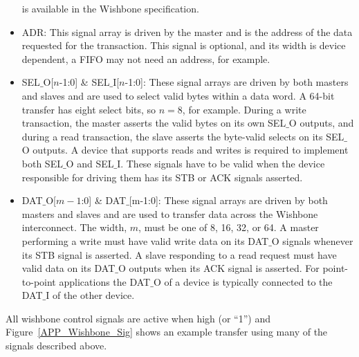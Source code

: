 \begin{itemize}
 is available in the Wishbone specification\cite{WB3_Spec}.
 \item ADR: This signal array is driven by the master and is the
 address of the data requested for the transaction. This signal is
 optional, and its width is device dependent, a FIFO may not need an address,
 for example.
 \item SEL$\_$O[$n$-1:0] \& SEL$\_$I[$n$-1:0]: These signal arrays are driven
 by both masters and slaves and are used to select valid bytes within a data
 word. A 64-bit transfer has eight select bits, so $n=8$, for example. During a
 write transaction, the master asserts the valid bytes on its own SEL$\_$O
 outputs, and during a read transaction, the slave asserts the byte-valid
 selects on its SEL$\_$O outputs. A device that supports reads and writes is
 required to implement both SEL$\_$O and SEL$\_$I. These signals have to
 be valid when the device responsible for driving them has its STB or
 ACK signals asserted.
 \item DAT$\_$O[$m-1$:0] \& DAT$\_$[m-1:0]: These signal arrays are driven by
 both masters and slaves and are used to transfer data across the Wishbone
 interconnect. The width, $m$, must be one of 8, 16, 32, or 64. A master
 performing a write must have valid write data on its DAT$\_$O signals whenever
 its STB signal is asserted. A slave responding to a read request must have valid
 data on its DAT$\_$O outputs when its ACK signal is asserted. For
 point-to-point applications the DAT$\_$O of a device is typically connected to
 the DAT$\_$I of the other device.
\end{itemize}

All wishbone control signals are active when high (or ``1'') and
Figure~\ref{APP_Wishbone_Sig} shows an example transfer using many of the
signals described above.
